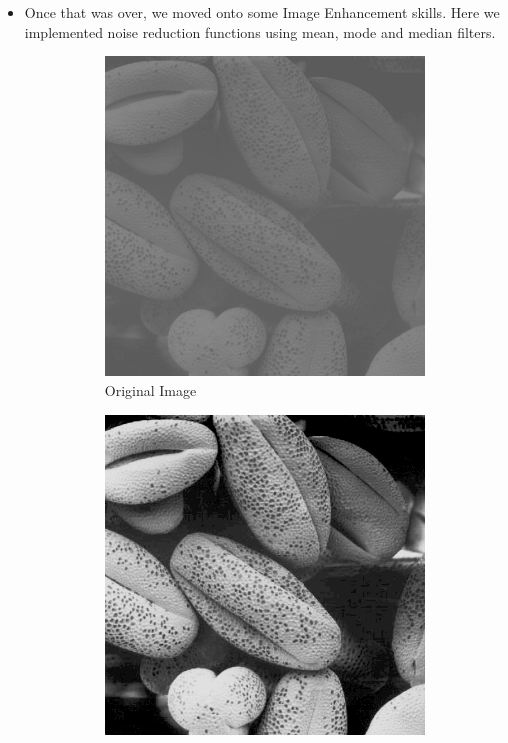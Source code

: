 \documentclass[a4paper]{article}
\begin{document}
\begin{itemize}
    \item Once that was over, we moved onto some Image Enhancement skills. Here we implemented noise reduction functions using mean, mode and median filters.
    \begin{figure}[h!]
        \centering
        \begin{subfigure}[b]{0.3\linewidth}
            \includegraphics[width=\linewidth]{Pictures/histogram equalization/5.png}
            \caption{Original Image}
        \end{subfigure}
        \begin{subfigure}[b]{0.3\linewidth}
            \includegraphics[width=\linewidth]{Pictures/histogram equalization/image_edited.png}

\end{subfigure}
\end{figure}
\end{itemize}
\end{document}
